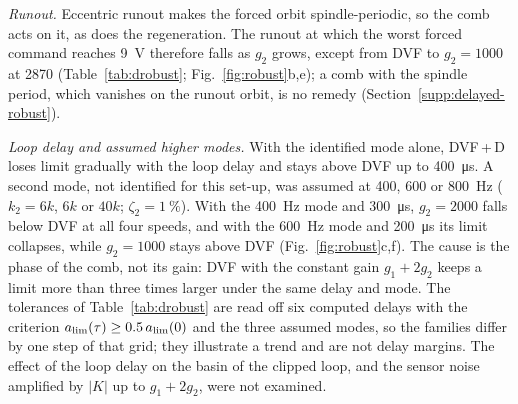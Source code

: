 \emph{Runout.} Eccentric runout makes the forced orbit spindle-periodic, so the comb acts on it, as does the regeneration. The runout at which the worst forced command reaches \SI{9}{\volt} therefore falls as $g_2$ grows, except from DVF to $g_2=1000$ at \SI{2870}{\rpm} (Table~\ref{tab:drobust}; Fig.~\ref{fig:robust}b,e); a comb with the spindle period, which vanishes on the runout orbit, is no remedy (Section~\ref{supp:delayed-robust}).

\emph{Loop delay and assumed higher modes.} With the identified mode alone, DVF\,+\,D loses limit gradually with the loop delay and stays above DVF up to \SI{400}{\micro\second}. A second mode, not identified for this set-up, was assumed at 400, 600 or \SI{800}{\hertz} ($k_2=6k$, $6k$ or $40k$; $\zeta_2=\SI{1}{\percent}$). With the \SI{400}{\hertz} mode and \SI{300}{\micro\second}, $g_2=2000$ falls below DVF at all four speeds, and with the \SI{600}{\hertz} mode and \SI{200}{\micro\second} its limit collapses, while $g_2=1000$ stays above DVF (Fig.~\ref{fig:robust}c,f). The cause is the phase of the comb, not its gain: DVF with the constant gain $g_1+2g_2$ keeps a limit more than three times larger under the same delay and mode. The tolerances of Table~\ref{tab:drobust} are read off six computed delays with the criterion $a_{\lim}(\tau)\ge0.5\,a_{\lim}(0)$ and the three assumed modes, so the families differ by one step of that grid; they illustrate a trend and are not delay margins. The effect of the loop delay on the basin of the clipped loop, and the sensor noise amplified by $\lvert K\rvert$ up to $g_1+2g_2$, were not examined.

